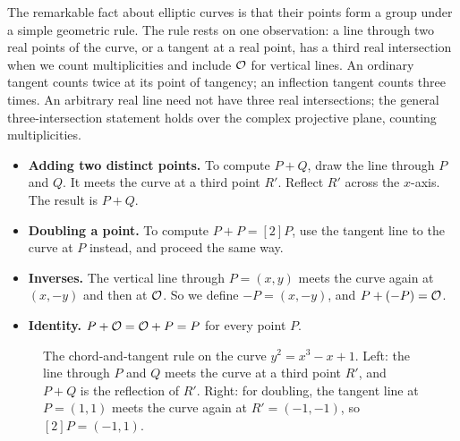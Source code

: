 The remarkable fact about elliptic curves is that their points form a
group under a simple geometric rule.
The rule rests on one observation: a line through two real points of the
curve, or a tangent at a real point, has a third real intersection when
we count multiplicities and include $\mathcal{O}$ for vertical lines.
An ordinary tangent counts twice at its point of tangency; an inflection
tangent counts three times. An arbitrary real line need not have three
real intersections; the general three-intersection statement holds over
the complex projective plane, counting multiplicities.
\begin{itemize}
  \item \textbf{Adding two distinct points.} To compute $P + Q$, draw the
        line through $P$ and $Q$. It meets the curve at a third point $R'$.
        Reflect $R'$ across the $x$-axis. The result is $P + Q$.
  \item \textbf{Doubling a point.} To compute $P + P = [2]P$, use the
        tangent line to the curve at $P$ instead, and proceed the same way.
  \item \textbf{Inverses.} The vertical line through $P = (x, y)$ meets the
        curve again at $(x, -y)$ and then at $\mathcal{O}$. So we define
        $-P = (x, -y)$, and $P + (-P) = \mathcal{O}$.
  \item \textbf{Identity.} $P + \mathcal{O} = \mathcal{O} + P = P$ for every point $P$.
\end{itemize}

\begin{figure}
\centering
{}
\hfill
{}
\caption{The chord-and-tangent rule on the curve $y^2 = x^3 - x + 1$.
Left: the line through $P$ and $Q$ meets the curve at a third point $R'$,
and $P + Q$ is the reflection of $R'$.
Right: for doubling, the tangent line at $P = (1,1)$ meets the curve
again at $R' = (-1,-1)$, so $[2]P = (-1, 1)$.}
\label{fig:ecc-chord}
\end{figure}

